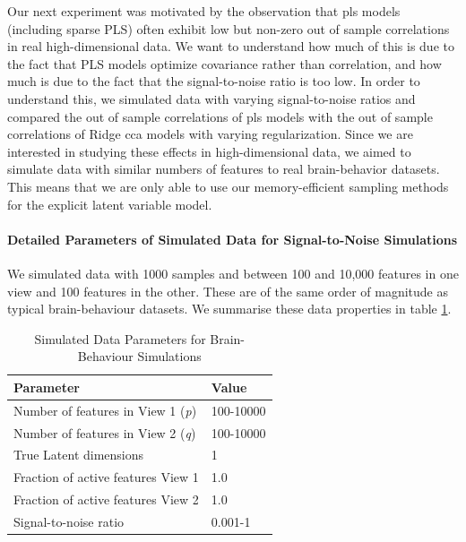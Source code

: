 Our next experiment was motivated by the observation that \acrshort{pls} models (including sparse PLS) often exhibit low but non-zero out of sample correlations in real high-dimensional data.
We want to understand how much of this is due to the fact that PLS models optimize covariance rather than correlation, and how much is due to the fact that the signal-to-noise ratio is too low.
In order to understand this, we simulated data with varying signal-to-noise ratios and compared the out of sample correlations of \acrshort{pls} models with the out of sample correlations of Ridge \acrshort{cca} models with varying regularization.
Since we are interested in studying these effects in high-dimensional data, we aimed to simulate data with similar numbers of features to real brain-behavior datasets.
This means that we are only able to use our memory-efficient sampling methods for the explicit latent variable model.

\paragraph{Detailed Parameters of Simulated Data for Signal-to-Noise Simulations}
We simulated data with 1000 samples and between 100 and 10,000 features in one view and 100 features in the other.
These are of the same order of magnitude as typical brain-behaviour datasets.
We summarise these data properties in table \ref{tab:simulated-data-parameters-bb}.

\begin{table}
    \centering
    \caption{Simulated Data Parameters for Brain-Behaviour Simulations}
    \begin{tabular}{| l | l |}
        \hline
        \textbf{Parameter}                        & \textbf{Value}                               \\
        \hline
        Number of features in View 1 (\textit{p}) & 100-10000 \\
        Number of features in View 2 (\textit{q}) & 100-10000 \\
        True Latent dimensions                    & 1                                            \\
        Fraction of active features View 1            & 1.0                                          \\
        Fraction of active features View 2            & 1.0                                          \\
        Signal-to-noise ratio                    & 0.001-1 \\
        \hline
    \end{tabular}\label{tab:simulated-data-parameters-bb}
\end{table}

